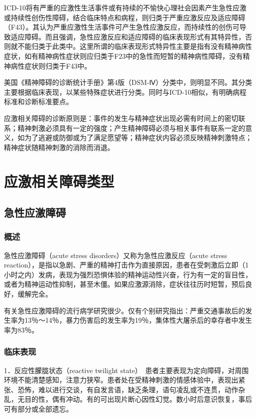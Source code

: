 ICD-10将有严重的应激性生活事件或有持续的不愉快心理社会因素产生急性应激或持续性创伤性障碍，结合临床特点和病程，则归类于严重应激反应及适应障碍（F43）。其认为严重应激性生活事件可产生急性应激反应，而持续性的创伤可导致适应障碍。而且强调，急性应激反应和适应障碍的临床表现形式有其特异性，否则就不能归类于此类中。这里所谓的临床表现形式特异性主要是指有没有精神病性症状，如有精神病性症状则应归类于F23中的急性而短暂的精神病性障碍，没有精神病性症状则归类于F43中。

美国《精神障碍的诊断统计手册》第4版（DSM-Ⅳ）分类中，则明显不同。其分类主要根据临床表现，以某些特殊症状进行分类。同时与ICD-10相似，有明确病程标准和诊断标准要点。

应激相关障碍的诊断原则是：事件的发生与精神症状出现必需有时间上的密切联系；精神刺激必须具有一定的强度；产生精神障碍必须与相关事件有联系一定的意义，如为了逃避或防御或为了满足愿望等；精神症状内容必须反映精神刺激特点；精神症状随精神刺激的消除而消退。

\section{应激相关障碍类型}

\subsection{急性应激障碍}

\subsubsection{概述}

急性应激障碍（acute stress disorders）又称为急性应激反应（acute stress
reaction），是指以急剧、严重的精神打击作为直接原因，患者在受刺激后立即（1小时之内）发病，表现为强烈恐惧体验的精神运动性兴奋，行为有一定的盲目性，或者为精神运动性抑制，甚至木僵。如果应激源消除，症状往往历时短暂，预后良好，缓解完全。

有关急性应激障碍的流行病学研究很少。仅有个别研究指出：严重交通事故后的发生率为13％～14％，暴力伤害后的发生率为19％，集体性大屠杀后的幸存者中发生率为83％。

\subsubsection{临床表现}

1．反应性朦胧状态（reactive twilight
state）　患者主要表现为定向障碍，对周围环境不能清楚感知，注意力狭窄。患者处在受精神刺激的情感体验中，表现出紧张、恐怖，难以进行交谈，有自发言语，缺乏条理，语句凌乱或不连贯，动作杂乱，无目的性，偶有冲动。有的可出现片断心因性幻觉。数小时后意识恢复，事后可有部分或全部遗忘。

